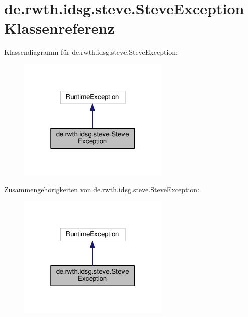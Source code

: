 \hypertarget{classde_1_1rwth_1_1idsg_1_1steve_1_1_steve_exception}{\section{de.\+rwth.\+idsg.\+steve.\+Steve\+Exception Klassenreferenz}
\label{classde_1_1rwth_1_1idsg_1_1steve_1_1_steve_exception}
}


Klassendiagramm für de.\+rwth.\+idsg.\+steve.\+Steve\+Exception\+:\nopagebreak
\begin{figure}[H]
\begin{center}
\leavevmode
\includegraphics[width=205pt]{classde_1_1rwth_1_1idsg_1_1steve_1_1_steve_exception__inherit__graph}
\end{center}
\end{figure}


Zusammengehörigkeiten von de.\+rwth.\+idsg.\+steve.\+Steve\+Exception\+:\nopagebreak
\begin{figure}[H]
\begin{center}
\leavevmode
\includegraphics[width=205pt]{classde_1_1rwth_1_1idsg_1_1steve_1_1_steve_exception__coll__graph}
\end{center}
\end{figure}
